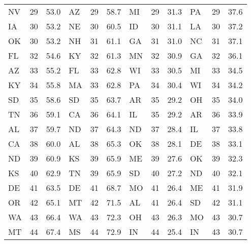 \begin{longtable}{lrr|lrr||lrr|lrr}
        NV &   29 &  53.0 &            AZ &   29 &   58.7 &             MI &   29 &   31.3 &            PA &   29 &   37.6 \\
        IA &   30 &  53.2 &            NE &   30 &   60.5 &             ID &   30 &   31.1 &            LA &   30 &   37.2 \\
        OK &   30 &  53.2 &            NH &   31 &   61.1 &             GA &   31 &   31.0 &            NC &   31 &   37.1 \\
        FL &   32 &  54.6 &            KY &   32 &   61.3 &             MN &   32 &   30.9 &            GA &   32 &   36.1 \\
        AZ &   33 &  55.2 &            FL &   33 &   62.8 &             WI &   33 &   30.5 &            MI &   33 &   34.5 \\
        KY &   34 &  55.8 &            MA &   33 &   62.8 &             PA &   34 &   30.4 &            WI &   34 &   34.2 \\
        SD &   35 &  58.6 &            SD &   35 &   63.7 &             AR &   35 &   29.2 &            OH &   35 &   34.0 \\
        TN &   36 &  59.1 &            CA &   36 &   64.1 &             IL &   35 &   29.2 &            AR &   36 &   33.9 \\
        AL &   37 &  59.7 &            ND &   37 &   64.3 &             ND &   37 &   28.4 &            IL &   37 &   33.8 \\
        CA &   38 &  60.0 &            AL &   38 &   65.3 &             OK &   38 &   28.1 &            DE &   38 &   33.1 \\
        ND &   39 &  60.9 &            KS &   39 &   65.9 &             ME &   39 &   27.6 &            OK &   39 &   32.3 \\
        KS &   40 &  62.9 &            TN &   39 &   65.9 &             SD &   40 &   27.2 &            ND &   40 &   32.1 \\
        DE &   41 &  63.5 &            DE &   41 &   68.7 &             MO &   41 &   26.4 &            ME &   41 &   31.9 \\
        OR &   42 &  65.1 &            MT &   42 &   71.5 &             AL &   41 &   26.4 &            SD &   42 &   31.1 \\
        WA &   43 &  66.4 &            WA &   43 &   72.3 &             OH &   43 &   26.3 &            MO &   43 &   30.7 \\
        MT &   44 &  67.4 &            MS &   44 &   72.9 &             IN &   44 &   25.4 &            IN &   43 &   30.7 \\

\end{longtable}
